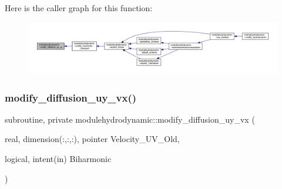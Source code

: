 Here is the caller graph for this function\+:\nopagebreak
\begin{figure}[H]
\begin{center}
\leavevmode
\includegraphics[width=350pt]{namespacemodulehydrodynamic_a1961c3204e40bc45322afca99ce797ea_icgraph}
\end{center}
\end{figure}
\mbox{\label{namespacemodulehydrodynamic_a8bf6e87d87f18ed2725786160a05e8d4}} 
\subsubsection{\texorpdfstring{modify\+\_\+diffusion\+\_\+uy\+\_\+vx()}{modify\_diffusion\_uy\_vx()}}
{\footnotesize\ttfamily subroutine, private modulehydrodynamic\+::modify\+\_\+diffusion\+\_\+uy\+\_\+vx (\begin{DoxyParamCaption}\item[{real, dimension(\+:,\+:,\+:), pointer}]{Velocity\+\_\+\+U\+V\+\_\+\+Old,  }\item[{logical, intent(in)}]{Biharmonic }\end{DoxyParamCaption})\hspace{0.3cm}{\ttfamily [private]}}

